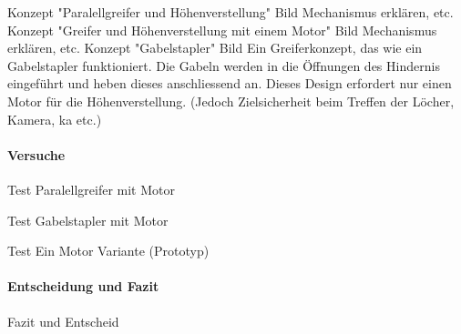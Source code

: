\documentclass[main.tex]{subfiles} %
\begin{document}
Konzept "Paralellgreifer und Höhenverstellung"
Bild
Mechanismus erklären, etc.
\newline
Konzept "Greifer und Höhenverstellung mit einem Motor"
Bild
Mechanismus erklären, etc.
\newline
Konzept "Gabelstapler"
Bild
Ein Greiferkonzept, das wie ein Gabelstapler funktioniert. Die Gabeln werden in die Öffnungen
des Hindernis eingeführt und heben dieses anschliessend an. Dieses Design erfordert nur einen
Motor für die Höhenverstellung. (Jedoch Zielsicherheit beim Treffen der Löcher, Kamera, ka etc.)

\paragraph{Versuche}

Test Paralellgreifer mit Motor

Test Gabelstapler mit Motor

Test Ein Motor Variante (Prototyp)

\paragraph{Entscheidung und Fazit}
Fazit und Entscheid
\end{document}
